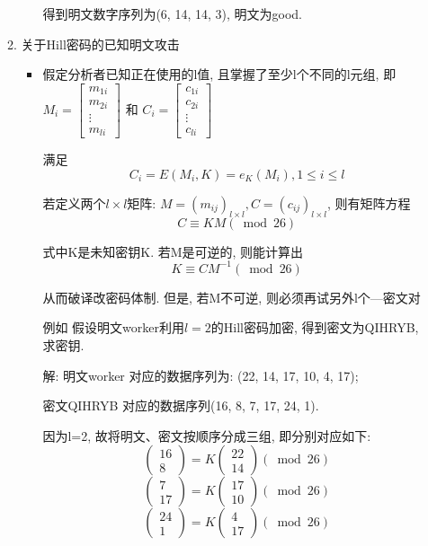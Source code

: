 \documentclass[UTF8]{ctexart}
\begin{document}
\begin{itemize}
\begin{enumerate}
\begin{itemize}
                    得到明文数字序列为(6, 14, 14, 3), 明文为good.
            \end{itemize}

            \item 关于Hill密码的已知明文攻击
            \begin{itemize}
                \item 假定分析者已知正在使用的l值, 且掌握了至少l个不同的l元组, 即
                $M_i=\left[ \begin{array}{c}{m_{1i}}\\ {m_{2i}}\\ \vdots\\ {m_{li}} \end{array}\right]$ 和
                    $C_i=\left[ \begin{array}{c}{c_{1i}}\\ {c_{2i}}\\ \vdots \\ {c_{li}} \end{array}\right]$

                满足
                $$C_i=E(M_i, K)=e_K(M_i), 1\le i\le l$$

                若定义两个$l\times l$矩阵: $M=(m_{ij})_{l\times l}, C=(c_{ij})_{l\times l}$, 则有矩阵方程
                $$C\equiv KM(\bmod 26)$$

                式中K是未知密钥K. 若M是可逆的, 则能计算出
                $$K\equiv CM^{-1}(\bmod 26)$$

                从而破译改密码体制. 但是, 若M不可逆, 则必须再试另外l个---密文对

                例如 假设明文worker利用$l=2$的Hill密码加密, 得到密文为QIHRYB, 求密钥.

                解: 明文worker 对应的数据序列为: (22, 14, 17, 10, 4, 17);

                密文QIHRYB 对应的数据序列(16, 8, 7, 17, 24, 1).

                因为l=2, 故将明文、密文按顺序分成三组, 即分别对应如下:
                $$\left( \begin{array}{c}{16}\\ {8} \end{array}\right)=K\left( \begin{array}{c}{22}\\ {14} \end{array}\right)(\bmod 26)$$
                $$\left( \begin{array}{c}{7}\\ {17} \end{array}\right)=K\left( \begin{array}{c}{17}\\ {10} \end{array}\right)(\bmod 26)$$
                $$\left( \begin{array}{c}{24}\\ {1} \end{array}\right)=K\left( \begin{array}{c}{4}\\ {17} \end{array}\right)(\bmod 26)$$


\end{itemize}
\end{enumerate}
\end{itemize}
\end{document}
